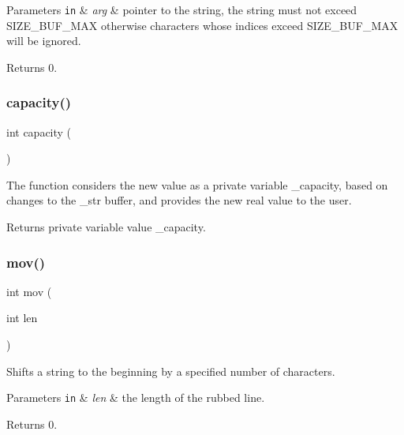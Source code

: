 \begin{DoxyParams}[1]{Parameters}
\mbox{\tt in}  & {\em arg} & pointer to the string, the string must not exceed S\+I\+Z\+E\+\_\+\+B\+U\+F\+\_\+\+M\+AX otherwise characters whose indices exceed S\+I\+Z\+E\+\_\+\+B\+U\+F\+\_\+\+M\+AX will be ignored. \\
\hline
\end{DoxyParams}
\begin{DoxyReturn}{Returns}
0. 
\end{DoxyReturn}
\mbox{\label{classmessage_ad7becd1f37b2db660d2335aec66075c8}} 
\subsubsection{\texorpdfstring{capacity()}{capacity()}}
{\footnotesize\ttfamily int capacity (\begin{DoxyParamCaption}{ }\end{DoxyParamCaption})}



The function considers the new value as a private variable \+\_\+capacity, based on changes to the \+\_\+str buffer, and provides the new real value to the user. 

\begin{DoxyReturn}{Returns}
private variable value \+\_\+capacity. 
\end{DoxyReturn}
\mbox{\label{classmessage_a6add30ca9731721b8b271a11c7279932}} 
\subsubsection{\texorpdfstring{mov()}{mov()}}
{\footnotesize\ttfamily int mov (\begin{DoxyParamCaption}\item[{int}]{len }\end{DoxyParamCaption})}



Shifts a string to the beginning by a specified number of characters. 


\begin{DoxyParams}[1]{Parameters}
\mbox{\tt in}  & {\em len} & the length of the rubbed line. \\
\hline
\end{DoxyParams}
\begin{DoxyReturn}{Returns}
0. 
\end{DoxyReturn}
\mbox{\label{classmessage_ac31cbd97176d63baa87ee8b2fddb51aa}} 

